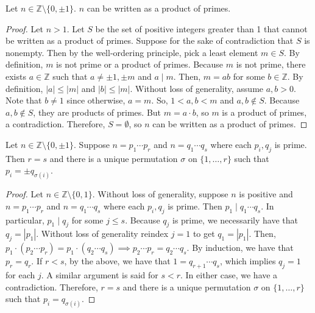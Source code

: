 \documentclass [12pt] {article}
\newcommand{\Z}{\mathbb{Z}}
\newenvironment{theorem}[1]{\begin{tcolorbox}[title={Theorem #1},colback=green!5!white,colframe=black!75!green]}{\end{tcolorbox}}
\begin{document}
\begin{theorem}{}
    Let $n \in \Z \setminus \{ 0, \pm 1 \}$. $n$ can be written as a product of primes.
\end{theorem}
\begin{proof}
    Let $n > 1$. Let $S$ be the set of positive integers greater than 1 that cannot be written
    as a product of primes. Suppose for the sake of contradiction that $S$ is nonempty. Then by the
    well-ordering principle, pick a least element $m \in S$. By definition, $m$ is not
    prime or a product of primes. Because $m$ is not prime, there exists $a \in \Z$ such
    that $a \neq \pm 1, \pm m$ and $a \mid m$. Then,
    $m = ab$ for some $b \in \Z$. By definition, $|a| \leq |m|$ and $|b| \leq |m|$. Without
    loss of generality, assume $a, b > 0$. Note that $b \neq 1$ since otherwise, $a = m$. So,
    $1 < a, b < m$ and $a, b \not \in S$. Because $a, b \not \in S$, they are
    products of primes. But $m = a \cdot b$, so $m$ is a product of primes, a contradiction.
    Therefore, $S = \emptyset$, so $n$ can be written as a product of primes.
\end{proof}

\begin{theorem}{(Fundamental Theorem of Arithmetic)}
    Let $n \in \Z \setminus \{ 0, \pm 1 \}$. Suppose $n = p_1 \cdots p_r$ and $n = q_1 \cdots q_s$
    where each $p_i, q_j$ is prime. Then $r = s$ and there is a unique permutation $\sigma$ on
    $\{ 1, \ldots, r \}$ such that $p_i = \pm q_{\sigma(i)}$.
\end{theorem}
\begin{proof}
    Let $n \in \Z \setminus \{ 0, 1 \}$. Without loss of generality, suppose $n$ is positive and
    $n = p_1 \cdots p_r$ and $n = q_1 \cdots q_s$ where each $p_i, q_j$ is prime. Then $p_1 \mid q_1
    \cdots q_s$. In particular, $p_1 \mid q_j$ for some $j \leq s$. Because $q_j$ is prime, we
    necessarily have that $q_j = |p_1|$. Without loss of generality reindex  $j = 1$ to get
    $q_1 = |p_1|$. Then,
    $
    p_1 \cdot (p_2 \cdots p_r) = p_1 \cdot (q_2 \cdots q_s)
    \implies
    p_2 \cdots p_r = q_2 \cdots q_s
    $. By induction, we have that $p_r = q_r$. If $r < s$, by the above, we have that
    $1 = q_{r + 1} \cdots q_s$, which implies $q_j = 1$ for each $j$. A similar argument is said for
    $s < r$. In either case, we have a contradiction. Therefore, $r = s$ and there is a unique
    permutation $\sigma$ on $\{ 1, \ldots, r \}$ such that $p_i = q_{\sigma(i)}$.
\end{proof}
\end{document}

